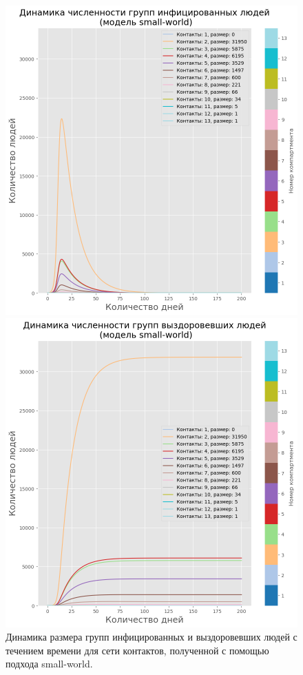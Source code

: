\documentclass[14pt,a4paper]{article}
\begin{document}
\begin{figure}[h!]
	\begin{minipage}{0.5\textwidth}
		\centering
		\includegraphics[width=\linewidth]{img/sir_model_small_world_I_rural_new.png}
	\end{minipage}
	\begin{minipage}{0.5\textwidth}
		\centering
		\includegraphics[width=\linewidth]{img/sir_model_small_world_R_rural_new.png}
	\end{minipage}
	\caption{Динамика размера групп инфицированных и выздоровевших людей с течением времени для сети контактов, полученной с помощью подхода small-world.}
	\label{fig:small_world_graphics}
\end{figure}
\end{document}

